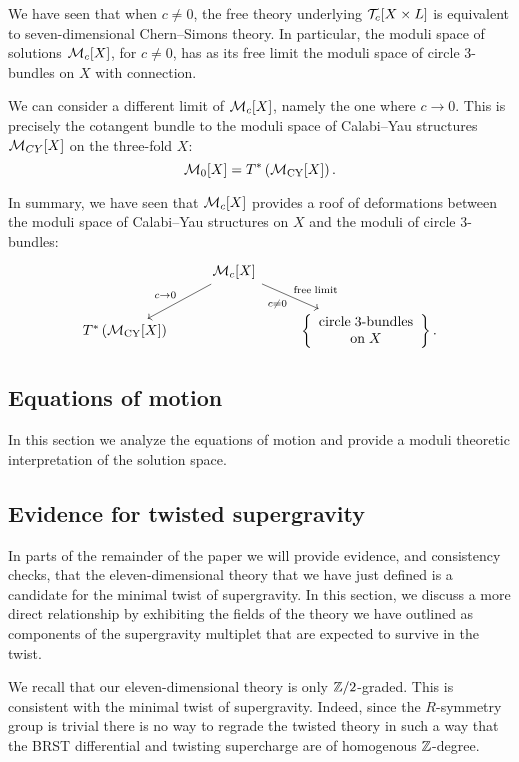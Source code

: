 \documentclass[11pt]{amsart}
\begin{document}
We have seen that when $c \ne 0$, the free theory underlying $\mathcal T_c[X \times L]$ is equivalent to seven-dimensional Chern--Simons theory.
In particular, the moduli space of solutions $\mathcal M_c[X]$, for $c \ne 0$, has as its free limit the moduli space of circle $3$-bundles on $X$ with connection.

We can consider a different limit of $\mathcal M_c[X]$, namely the one where $c \to 0$.
This is precisely the cotangent bundle to the moduli space of Calabi--Yau structures $\mathcal M_{CY}[X]$ on the three-fold $X$:
\[
  \mathcal M_0[X] = T^* \left(\mathcal M_{\rm CY} [X]\right) .
\]

In summary, we have seen that $\mathcal M_c[X]$ provides a roof of deformations between the moduli space of Calabi--Yau structures on $X$ and the moduli of circle $3$-bundles:
\[
  \begin{tikzcd}
    & \cM_c[X] \ar[dr, "c \ne 0"', "{\rm free\;limit}"] \ar[dl, "c \to 0"'] & \\ T^* \left(\cM_{\rm CY} [X] \right) & & \left\{ \begin{array}{ccc} \mbox{circle\;3-bundles} \\ {\rm on} \; X \end{array} \right\} .
  \end{tikzcd}
\]


\subsection{Equations of motion}
\label{sec:org2973a4d}
In this section we analyze the equations of motion and provide a moduli theoretic interpretation of the solution space.

\subsection{Evidence for twisted supergravity}


In parts of the remainder of the paper we will provide evidence, and consistency checks, that the eleven-dimensional theory that we have just defined is a candidate for the minimal twist of supergravity.
In this section, we discuss a more direct relationship by exhibiting the fields of the theory we have outlined as components of the supergravity multiplet that are expected to survive in the twist.

We recall that our eleven-dimensional theory is only $\mathbb Z/2$-graded.
This is consistent with the minimal twist of supergravity.
Indeed, since the $R$-symmetry group is trivial there is no way to regrade the twisted theory in such a way that the BRST differential and twisting supercharge are of homogenous $\mathbb Z$-degree.
\end{document}
